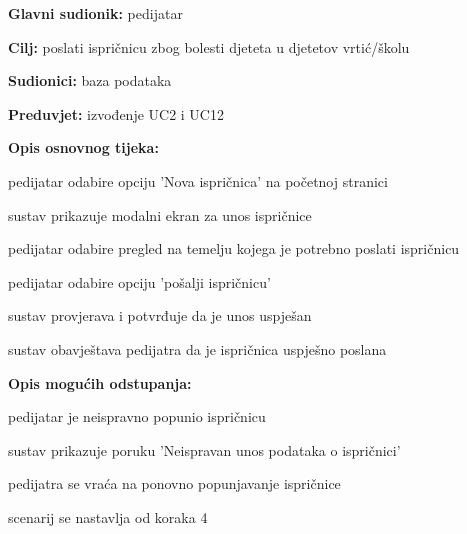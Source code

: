                     \noindent {}
					\begin{packed_item}
	
						\item \textbf{Glavni sudionik: }pedijatar
						\item  \textbf{Cilj:} poslati ispričnicu zbog bolesti djeteta u djetetov vrtić/školu
						\item  \textbf{Sudionici:} baza podataka
						\item  \textbf{Preduvjet:} izvođenje UC2 i UC12
						\item  \textbf{Opis osnovnog tijeka:}
						
						\item[] \begin{packed_enum}
	
							\item pedijatar odabire opciju 'Nova ispričnica' na početnoj stranici
							\item sustav prikazuje modalni ekran za unos ispričnice
							\item pedijatar odabire pregled na temelju kojega je potrebno poslati ispričnicu
                            \item pedijatar odabire opciju 'pošalji ispričnicu'
                            \item sustav provjerava i potvrđuje da je unos uspješan
                            \item sustav obavještava pedijatra da je ispričnica uspješno poslana

						\end{packed_enum}
						
						\item  \textbf{Opis mogućih odstupanja:}
						
						\item[] \begin{packed_item}
	
                            \item[5.a] pedijatar je neispravno popunio ispričnicu
							\item[] \begin{packed_enum}
								\item sustav prikazuje poruku 'Neispravan unos podataka o ispričnici'
								\item pedijatra se vraća na ponovno popunjavanje ispričnice
								\item scenarij se nastavlja od koraka 4
							\end{packed_enum}
							
						\end{packed_item}
					\end{packed_item}

